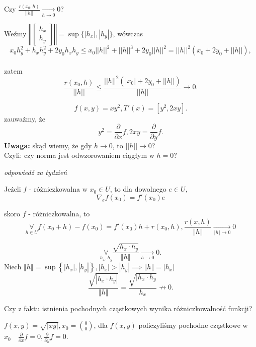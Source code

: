 \documentclass[../main.tex]{subfiles}
\begin{document}
\pagebreak
\begin{pytanie}
    Czy $\frac{r(x_0,h)}{||h||}\underset{h \to 0}{\longrightarrow} 0$?
\end{pytanie}
Weźmy $\left\Vert \begin{bmatrix} h_x\\h_y \end{bmatrix} \right\Vert = \sup\{|h_x|,|h_y|\}$, wówczas\\
\[
    x_0h_y^2 + h_xh_y^2 + 2y_0h_xh_y \leq x_0 ||h||^2 + ||h||^3 + 2y_0||h||^2 = ||h||^2(x_0 +2y_0 + ||h||),
\]\\
zatem
\[
    \frac{r(x_0,h)}{||h||} \leq \frac{||h||^2(|x_0|+2y_0+||h||)}{||h||} \to 0.
\]

\[
    f(x,y)=xy^2, T'(x)=[y^2,2xy].
\]
zauważmy, że
\[
    y^2= \frac{\partial}{\partial x} f, 2xy = \frac{\partial}{\partial y} f.
\]
\textbf{Uwaga: }skąd wiemy, że gdy $h\to 0$, to $||h||\to 0$?\\
Czyli: czy norma jest odwzorowaniem ciągłym w $h=0$?

\textit{odpowiedź za tydzień}

\begin{tw}
Jeżeli $f$ - różniczkowalna w $x_0 \in U$, to dla dowolnego $e\in U$, $$\nabla_e f(x_0) = f'(x_0)e$$
\end{tw}

\begin{dowod}
    skoro $f$ - różniczkowalna, to
    \begin{equation}
        \label{eq: eq_2.1}
        \underset{h\in U}{\forall} f(x_0+h) - f(x_0) = f'(x_0)h + r(x_0,h), \frac{r(x,h)}{\Vert h \Vert } \underset{\Vert h \Vert \to 0}{\longrightarrow} 0
    \end{equation}

    \[
        \underset{h_x, h_y}{\forall} \frac{\sqrt{h_x\cdot h_y} }{\left\Vert h \right\Vert } \underset{h\to 0}{\longrightarrow} 0
    .\]
Niech $\left\Vert h \right\Vert = \sup \left\{ |h_x|, |h_y| \right\}, |h_x| > |h_y| \implies \left\Vert h \right\Vert = |h_x|$
\[
    \frac{\sqrt{|h_x \cdot h_y|} }{\left\Vert h \right\Vert } = \frac{\sqrt{|h_x \cdot h_y}}{h_x} \not \to  0
.\]


\end{dowod}


\begin{pytanie}
Czy z faktu istnienia pochodnych cząstkowych wynika różniczkowalność funkcji?
\end{pytanie}

\begin{przyklad}
\end{przyklad}
$f(x,y) = \sqrt{|xy|}, x_0=\binom{0}{0}$, dla $f(x,y)$ policzyliśmy pochodne cząstkowe w $x_0 \quad \frac{\partial}{\partial x} f = 0, \frac{\partial}{\partial y} f = 0$.
\vspace{0.3cm}
\end{document}
